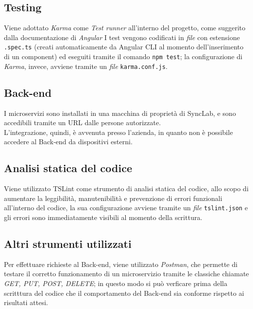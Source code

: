\subsection{Testing}
Viene adottato \textit{Karma} come \textit{Test runner} all'interno del progetto, come suggerito dalla documentazione di \textit{Angular}
I test vengono codificati in \textit{file} con estensione \texttt{.spec.ts} (creati automaticamente da Angular CLI al momento dell'inserimento di un component) ed eseguiti tramite il comando \texttt{npm test}; la configurazione di \textit{Karma}, invece, avviene tramite un \textit{file} \texttt{karma.conf.js}.

\subsection{Back-end}
I microservizi sono installati in una macchina di proprietà di SyncLab, e sono accedibili tramite un URL dalle persone autorizzate.\\
L'integrazione, quindi, è avvenuta presso l'azienda, in quanto non è possibile accedere al \gls{Back-end} da dispositivi esterni.

\subsection{Analisi statica del codice} \label{tslint}
Viene utilizzato TSLint come strumento di analisi statica del codice, allo scopo di aumentare la leggibilità, manutenibilità e prevenzione di errori funzionali all'interno del codice, la sua configurazione avviene tramite un \textit{file} \texttt{tslint.json} e gli errori sono immediatamente visibili al momento della scrittura.

\subsection{Altri strumenti utilizzati}
Per effettuare richieste al \gls{Back-end}, viene utilizzato \textit{Postman}, che permette di testare il corretto funzionamento di un microservizio tramite le classiche chiamate \textit{GET, PUT, POST, DELETE}; in questo modo si può verficare prima della scritttura del codice che il comportamento del \gls{Back-end} sia conforme rispetto ai risultati attesi.

